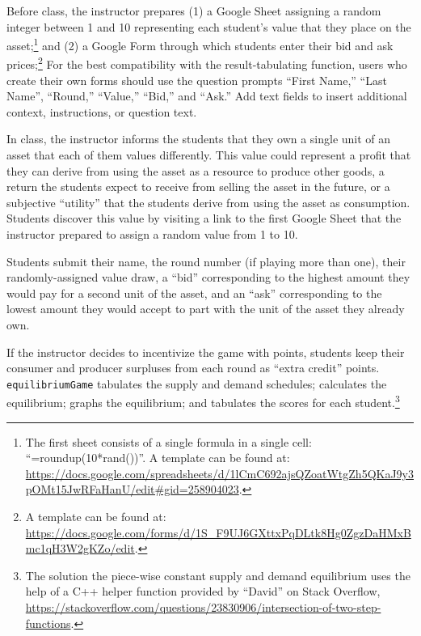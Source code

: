 \documentclass[
]{article}
\begin{document}
Before class, the instructor prepares (1) a Google Sheet assigning a
random integer between 1 and 10 representing each student's value that
they place on the asset;\footnote{The first sheet consists of a single
  formula in a single cell: ``=roundup(10*rand())''. A template can be
  found at:\\
  \url{https://docs.google.com/spreadsheets/d/1lCmC692ajsQZoatWtgZh5QKaJ9y3pOMt15JwRFaHanU/edit\#gid=258904023}.}
and (2) a Google Form through which students enter their bid and ask
prices;\footnote{A template can be found at:\\
  \url{https://docs.google.com/forms/d/1S_F9UJ6GXttxPqDLtk8Hg0ZgzDaHMxBmc1qH3W2gKZo/edit}.}
For the best compatibility with the result-tabulating function, users
who create their own forms should use the question prompts ``First
Name,'' ``Last Name'', ``Round,'' ``Value,'' ``Bid,'' and ``Ask.'' Add
text fields to insert additional context, instructions, or question
text.

In class, the instructor informs the students that they own a single
unit of an asset that each of them values differently. This value could
represent a profit that they can derive from using the asset as a
resource to produce other goods, a return the students expect to receive
from selling the asset in the future, or a subjective ``utility'' that
the students derive from using the asset as consumption. Students
discover this value by visiting a link to the first Google Sheet that
the instructor prepared to assign a random value from 1 to 10.

Students submit their name, the round number (if playing more than one),
their randomly-assigned value draw, a ``bid'' corresponding to the
highest amount they would pay for a second unit of the asset, and an
``ask'' corresponding to the lowest amount they would accept to part
with the unit of the asset they already own.

If the instructor decides to incentivize the game with points, students
keep their consumer and producer surpluses from each round as ``extra
credit'' points. \texttt{equilibriumGame} tabulates the supply and
demand schedules; calculates the equilibrium; graphs the equilibrium;
and tabulates the scores for each student.\footnote{The solution the
  piece-wise constant supply and demand equilibrium uses the help of a
  C++ helper function provided by ``David'' on Stack Overflow,\\
  \url{https://stackoverflow.com/questions/23830906/intersection-of-two-step-functions}.}
\end{document}
